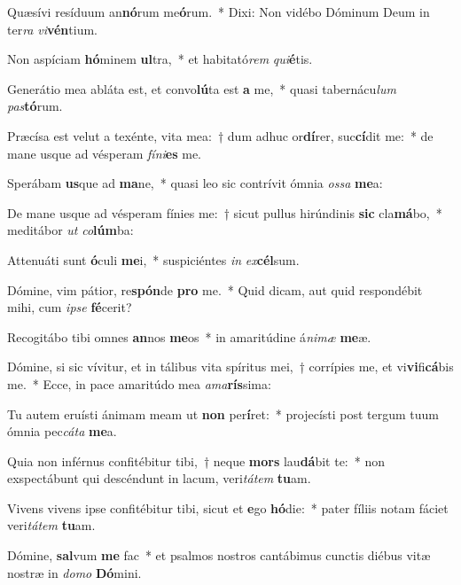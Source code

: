 \item Quæsívi resíduum an\textbf{nó}rum me\textbf{ó}rum.~* Dixi: Non vidébo Dóminum Deum in ter\textit{ra} \textit{vi}\textbf{vén}tium.
\item Non aspíciam \textbf{hó}minem \textbf{ul}tra,~* et habitató\textit{rem} \textit{qui}\textbf{é}tis.
\item Generátio mea abláta est, et convo\textbf{lú}ta est \textbf{a} me,~* quasi tabernácu\textit{lum} \textit{pas}\textbf{tó}rum.
\item Præcísa est velut a texénte, vita mea:~† dum adhuc or\textbf{dí}rer, suc\textbf{cí}dit me:~* de mane usque ad vésperam \textit{fí}\textit{ni}\textbf{es} me.
\item Sperábam \textbf{us}que ad \textbf{ma}ne,~* quasi leo sic contrívit ómnia \textit{os}\textit{sa} \textbf{me}a:
\item De mane usque ad vésperam fínies me:~† sicut pullus hirúndinis \textbf{sic} cla\textbf{má}bo,~* meditábor \textit{ut} \textit{co}\textbf{lúm}ba:
\item Attenuáti sunt \textbf{ó}culi \textbf{me}i,~* suspiciéntes \textit{in} \textit{ex}\textbf{cél}sum.
\item Dómine, vim pátior, re\textbf{spón}de \textbf{pro} me.~* Quid dicam, aut quid respondébit mihi, cum \textit{ip}\textit{se} \textbf{fé}cerit?
\item Recogitábo tibi omnes \textbf{an}nos \textbf{me}os~* in amaritúdine á\textit{ni}\textit{mæ} \textbf{me}æ.
\item Dómine, si sic vívitur, et in tálibus vita spíritus mei,~† corrípies me, et vi\textbf{vi}fi\textbf{cá}bis me.~* Ecce, in pace amaritúdo mea \textit{a}\textit{ma}\textbf{rís}sima:
\item Tu autem eruísti ánimam meam ut \textbf{non} per\textbf{í}ret:~* projecísti post tergum tuum ómnia pec\textit{cá}\textit{ta} \textbf{me}a.
\item Quia non inférnus confitébitur tibi,~† neque \textbf{mors} lau\textbf{dá}bit te:~* non exspectábunt qui descéndunt in lacum, veri\textit{tá}\textit{tem} \textbf{tu}am.
\item Vivens vivens ipse confitébitur tibi, sicut et \textbf{e}go \textbf{hó}die:~* pater fíliis notam fáciet veri\textit{tá}\textit{tem} \textbf{tu}am.
\item Dómine, \textbf{sal}vum \textbf{me} fac~* et psalmos nostros cantábimus cunctis diébus vitæ nostræ in \textit{do}\textit{mo} \textbf{Dó}mini.
